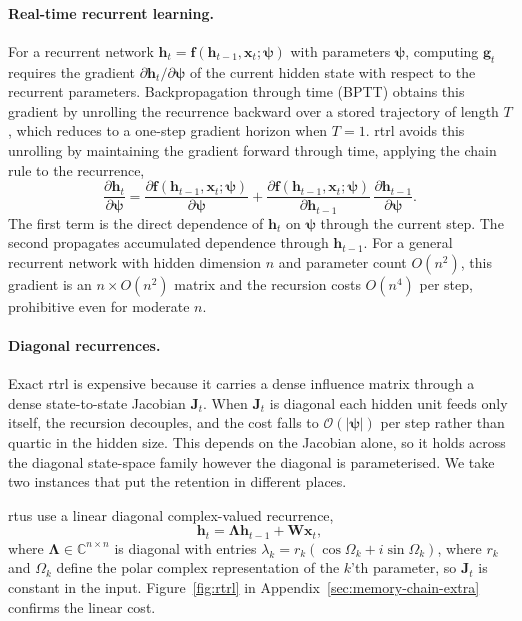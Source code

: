 \documentclass{article}
\begin{document}
\paragraph{Real-time recurrent learning.}
For a recurrent network $\boldsymbol{h}_t = \boldsymbol{f}(\boldsymbol{h}_{t-1}, \boldsymbol{x}_t; \boldsymbol{\psi})$ with parameters
$\boldsymbol{\psi}$, computing $\boldsymbol{g}_t$ requires the gradient
$\partial \boldsymbol{h}_t / \partial \boldsymbol{\psi}$ of the current hidden state with respect to
the recurrent parameters. Backpropagation through time (BPTT) obtains this gradient by unrolling the recurrence backward over a stored trajectory of length $T$, which reduces to a one-step gradient horizon when $T=1$. \gls{rtrl}
\citep{williams1989learning} avoids this unrolling by maintaining the gradient forward through time, applying the chain rule to the recurrence,
\begin{equation}
    \frac{\partial \boldsymbol{h}_t}{\partial \boldsymbol{\psi}}
    = \frac{\partial \boldsymbol{f}(\boldsymbol{h}_{t-1},\boldsymbol{x}_t; \boldsymbol{\psi})}{\partial \boldsymbol{\psi}}
    + \frac{\partial \boldsymbol{f}(\boldsymbol{h}_{t-1},\boldsymbol{x}_t; \boldsymbol{\psi})}{\partial \boldsymbol{h}_{t-1}} \,
      \frac{\partial \boldsymbol{h}_{t-1}}{\partial \boldsymbol{\psi}}.
\end{equation}
The first term is the direct dependence of $\boldsymbol{h}_t$ on $\boldsymbol{\psi}$ through the
current step. The second propagates accumulated dependence through
$\boldsymbol{h}_{t-1}$. For a general recurrent network with hidden dimension $n$ and
parameter count $O(n^2)$, this gradient is an $n \times O(n^2)$ matrix
and the recursion costs $O(n^4)$ per step, prohibitive even for moderate
$n$.

\paragraph{Diagonal recurrences.}
Exact \gls{rtrl} is expensive because it carries a dense influence matrix through a dense
state-to-state Jacobian $\boldsymbol{J}_t$. When $\boldsymbol{J}_t$ is diagonal each hidden unit
feeds only itself, the recursion decouples, and the cost falls to
$\mathcal{O}(|\boldsymbol{\psi}|)$ per step rather than quartic in the hidden size. This depends
on the Jacobian alone, so it holds across the diagonal state-space family however the diagonal is
parameterised. We take two instances that put the retention in different places.

\gls{rtu}s \citep{elelimy2024real} use a linear diagonal complex-valued recurrence,
\begin{equation}
    \boldsymbol{h}_t = \boldsymbol{\Lambda} \boldsymbol{h}_{t-1} + \boldsymbol{W} \boldsymbol{x}_t,
\end{equation}
where $\boldsymbol{\Lambda} \in \mathbb{C}^{n\times n}$ is diagonal with entries
$\lambda_k = r_k(\cos\Omega_k + i\sin\Omega_k)$, where $r_k$ and $\Omega_k$ define the polar
complex representation of the $k$'th parameter, so $\boldsymbol{J}_t$ is constant in the input.
Figure~\ref{fig:rtrl} in Appendix~\ref{sec:memory-chain-extra} confirms the linear cost.
\end{document}
